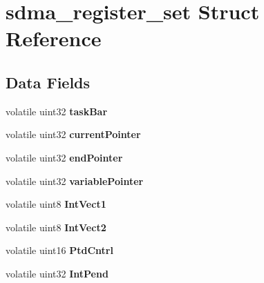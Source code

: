 \hypertarget{structsdma__register__set}{}\section{sdma\+\_\+register\+\_\+set Struct Reference}
\label{structsdma__register__set}
\subsection*{Data Fields}
\begin{DoxyCompactItemize}
\item 
\mbox{\label{structsdma__register__set_ab0056f86e4bbf82725cb726425f5f8e6}} 
volatile uint32 {\bfseries task\+Bar}
\item 
\mbox{\label{structsdma__register__set_aaee2f67202d9f167946bcded7f315a93}} 
volatile uint32 {\bfseries current\+Pointer}
\item 
\mbox{\label{structsdma__register__set_ab10b906d25b3cafc67999e5f151b148a}} 
volatile uint32 {\bfseries end\+Pointer}
\item 
\mbox{\label{structsdma__register__set_a696109f605dec455d57a778a64d38275}} 
volatile uint32 {\bfseries variable\+Pointer}
\item 
\mbox{\label{structsdma__register__set_afad10b2ac93a5ff4251ef20681da7a56}} 
volatile uint8 {\bfseries Int\+Vect1}
\item 
\mbox{\label{structsdma__register__set_af125f30b97e8a769ff1ca07e1939f705}} 
volatile uint8 {\bfseries Int\+Vect2}
\item 
\mbox{\label{structsdma__register__set_acd7d2b5c859d8e43f38a9e930ad6471a}} 
volatile uint16 {\bfseries Ptd\+Cntrl}
\item 
\mbox{\label{structsdma__register__set_a67ccb8f8b53e81506334b47afd9be534}} 
volatile uint32 {\bfseries Int\+Pend}
\item 
\mbox{\label{structsdma__register__set_adb0f31329ad29047c29782d74a492ab9}} 

\end{DoxyCompactItemize}

